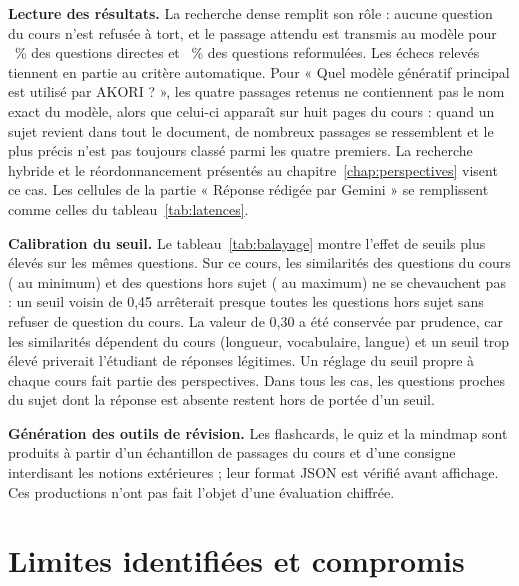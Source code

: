 \documentclass[12pt,a4paper,oneside]{report}
\begin{document}
\textbf{Lecture des résultats.} La recherche dense remplit son rôle : aucune question du cours n'est refusée à tort, et le passage attendu est transmis au modèle pour \SeuilCoursRappelPct~\% des questions directes et \SeuilRefoRappelPct~\% des questions reformulées. Les échecs relevés tiennent en partie au critère automatique. Pour « Quel modèle génératif principal est utilisé par AKORI ? », les quatre passages retenus ne contiennent pas le nom exact du modèle, alors que celui-ci apparaît sur huit pages du cours : quand un sujet revient dans tout le document, de nombreux passages se ressemblent et le plus précis n'est pas toujours classé parmi les quatre premiers. La recherche hybride et le réordonnancement présentés au chapitre~\ref{chap:perspectives} visent ce cas. Les cellules de la partie « Réponse rédigée par Gemini » se remplissent comme celles du tableau~\ref{tab:latences}.

\textbf{Calibration du seuil.} Le tableau~\ref{tab:balayage} montre l'effet de seuils plus élevés sur les mêmes questions. Sur ce cours, les similarités des questions du cours (\SeuilRefoMin{} au minimum) et des questions hors sujet (\SeuilHorsMax{} au maximum) ne se chevauchent pas : un seuil voisin de 0,45 arrêterait presque toutes les questions hors sujet sans refuser de question du cours. La valeur de 0,30 a été conservée par prudence, car les similarités dépendent du cours (longueur, vocabulaire, langue) et un seuil trop élevé priverait l'étudiant de réponses légitimes. Un réglage du seuil propre à chaque cours fait partie des perspectives. Dans tous les cas, les questions proches du sujet dont la réponse est absente restent hors de portée d'un seuil.

\begin{table}[H]
\centering
\caption{Effet du seuil de similarité sur les questions du banc de test}\label{tab:balayage}

\end{table}

\textbf{Génération des outils de révision.} Les flashcards, le quiz et la mindmap sont produits à partir d'un échantillon de passages du cours et d'une consigne interdisant les notions extérieures ; leur format JSON est vérifié avant affichage. Ces productions n'ont pas fait l'objet d'une évaluation chiffrée.

\section{Limites identifiées et compromis}
\end{document}
